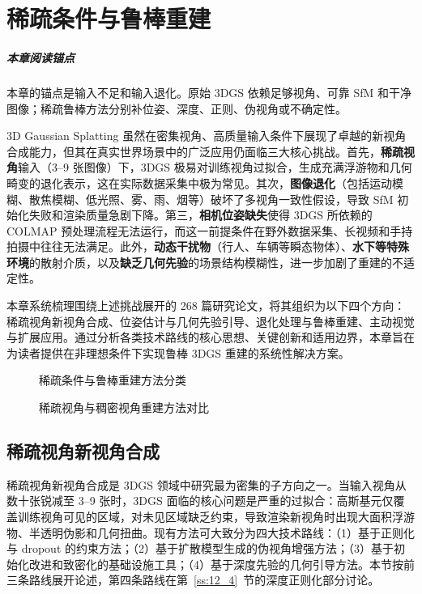 \chapter{稀疏条件与鲁棒重建}
\label{ch:12}

\paragraph*{本章阅读锚点}
本章的锚点是输入不足和输入退化。原始 3DGS 依赖足够视角、可靠 SfM 和干净图像；稀疏鲁棒方法分别补位姿、深度、正则、伪视角或不确定性。


3D Gaussian Splatting 虽然在密集视角、高质量输入条件下展现了卓越的新视角合成能力，但其在真实世界场景中的广泛应用仍面临三大核心挑战。首先，\textbf{稀疏视角}输入（3--9 张图像）下，3DGS 极易对训练视角过拟合，生成充满浮游物和几何畸变的退化表示，这在实际数据采集中极为常见。其次，\textbf{图像退化}（包括运动模糊、散焦模糊、低光照、雾、雨、烟等）破坏了多视角一致性假设，导致 SfM 初始化失败和渲染质量急剧下降。第三，\textbf{相机位姿缺失}使得 3DGS 所依赖的 COLMAP 预处理流程无法运行，而这一前提条件在野外数据采集、长视频和手持拍摄中往往无法满足。此外，\textbf{动态干扰物}（行人、车辆等瞬态物体）、\textbf{水下等特殊环境}的散射介质，以及\textbf{缺乏几何先验}的场景结构模糊性，进一步加剧了重建的不适定性。

本章系统梳理围绕上述挑战展开的 268 篇研究论文，将其组织为以下四个方向：稀疏视角新视角合成、位姿估计与几何先验引导、退化处理与鲁棒重建、主动视觉与扩展应用。通过分析各类技术路线的核心思想、关键创新和适用边界，本章旨在为读者提供在非理想条件下实现鲁棒 3DGS 重建的系统性解决方案。

\begin{figure}[htbp]
\centering
\resizebox{\textwidth}{!}{}
\caption{稀疏条件与鲁棒重建方法分类}
\label{fig:ch12_sparse_taxonomy}
\end{figure}

\begin{figure}[htbp]
\centering
\resizebox{\textwidth}{!}{}
\caption{稀疏视角与稠密视角重建方法对比}
\label{fig:ch12_sparse_comparison}
\end{figure}

\section{稀疏视角新视角合成}
\label{sec:12_sparse_nvs}

稀疏视角新视角合成是 3DGS 领域中研究最为密集的子方向之一。当输入视角从数十张锐减至 3--9 张时，3DGS 面临的核心问题是严重的过拟合：高斯基元仅覆盖训练视角可见的区域，对未见区域缺乏约束，导致渲染新视角时出现大面积浮游物、半透明伪影和几何扭曲。现有方法可大致分为四大技术路线：（1）基于正则化与 dropout 的约束方法；（2）基于扩散模型生成的伪视角增强方法；（3）基于初始化改进和致密化的基础设施工具；（4）基于深度先验的几何引导方法。本节按前三条路线展开论述，第四条路线在第~\ref{ss:12_4}~节的深度正则化部分讨论。

